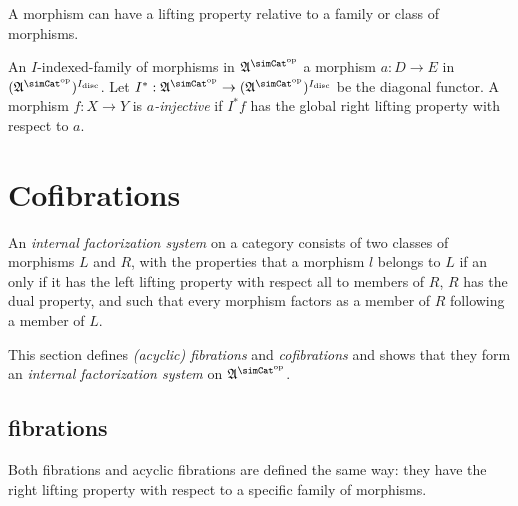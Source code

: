 \documentclass{tac}
\newcommand\hide[1]{}
\newcommand\ri{^*}
\newcommand\dual{^{\mathrm{op}}}
\newcommand\disc{_{\mathrm{disc}}}
\newcommand\s{^{\simCat\dual}}
\newcommand\of{:}
\newcommand\ambient{\mathfrak A}
\begin{document}
A morphism can have a lifting property relative to a family or class of morphisms.


\hide{
New idea: everything follows form the projectivity of added faces.

We don't need the object of realizers anymore either.

Explain $I\ri\of\ambient\s\to (\ambient\s)^{I\disc}$ somewhere. It should be an internal simplicial object of the slice category. i.e. $(\ambient/I)\s$. 
}
\begin{definition}[Injective] An $I$-indexed-family of morphisms in $\ambient\s$ a morphism $a\of D\to E$ in $(\ambient\s)^{I\disc}$. Let $I\ri\of\ambient\s\to (\ambient\s)^{I\disc}$ be the diagonal functor. A morphism $f\of X\to Y$ is \emph{$a$-injective} if $I\ri f$ has the global right lifting property with respect to $a$.
\end{definition}


\section{Cofibrations}%

\begin{definition} An \emph{internal factorization system} on a category consists of two classes of morphisms $L$ and $R$, with the properties that a morphism $l$ belongs to $L$ if an only if it has the left lifting property with respect all to members of $R$, $R$ has the dual property, and such that every morphism factors as a member of $R$ following a member of $L$.\end{definition}

This section defines \emph{(acyclic) fibrations} and \emph{cofibrations} and shows that they form an \emph{internal factorization system} on $\ambient\s$.

\subsection{fibrations}
\hide{ 

Idea: define Kan fibrations, define cofibrations, demonstrate the lifting properties. Move on happily.

New idea: go by factorization system.

1. The lifting properties of cofibrations
2. Factorization property

}
Both fibrations and acyclic fibrations are defined the same way: they have the right lifting property with respect to a specific family of morphisms.
\end{document}
